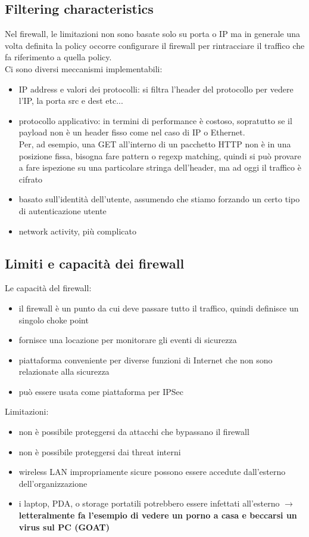 \documentclass[12pt, oneside]{extbook} %
\begin{document}
\subsection{Filtering characteristics}
Nel firewall, le limitazioni non sono basate solo su porta o IP ma in generale una volta definita la policy occorre configurare il firewall per rintracciare il traffico che fa riferimento a quella policy.
\\Ci sono diversi meccanismi implementabili:
\begin{itemize}
\item IP address e valori dei protocolli: si filtra l'header del protocollo per vedere l'IP, la porta src e dest etc...
\item protocollo applicativo: in termini di performance è costoso, sopratutto se il payload non è un header fisso come nel caso di IP o Ethernet.
\\Per, ad esempio, una GET all'interno di un pacchetto HTTP non è in una posizione fissa, bisogna fare pattern o regexp matching, quindi si può provare a fare ispezione su una particolare stringa dell'header, ma ad oggi il traffico è cifrato
\item basato sull'identità dell'utente, assumendo che stiamo forzando un certo tipo di autenticazione utente
\item network activity, più complicato
\end{itemize}

\subsection{Limiti e capacità dei firewall}
Le capacità del firewall:
\begin{itemize}
\item il firewall è un punto da cui deve passare tutto il traffico, quindi definisce un singolo choke point 
\item fornisce una locazione per monitorare gli eventi di sicurezza
\item piattaforma conveniente per diverse funzioni di Internet che non sono relazionate alla sicurezza
\item può essere usata come piattaforma per IPSec
\end{itemize}

Limitazioni:
\begin{itemize}
\item non è possibile proteggersi da attacchi che bypassano il firewall
\item non è possibile proteggersi dai threat interni
\item wireless LAN impropriamente sicure possono essere accedute dall'esterno dell'organizzazione
\item i laptop, PDA, o storage portatili potrebbero essere infettati all'esterno $\rightarrow$ \textbf{letteralmente fa l'esempio di vedere un porno a casa e beccarsi un virus sul PC (GOAT)}
\end{itemize}
\end{document}
